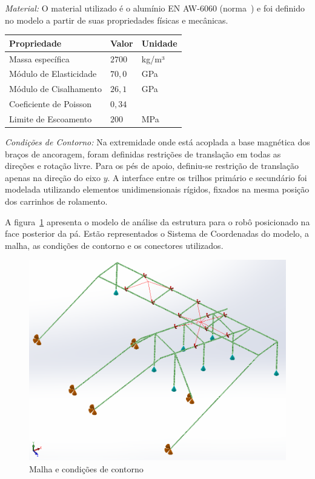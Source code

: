 \textit{Material:} O material utilizado é o alumínio EN AW-6060
(norma~\cite{DIN_2007}) e foi definido no modelo a partir de suas propriedades físicas e mecânicas.

\begin{center}
\centering
\begin{tabular}{|l|l|l|}
\hline
\textbf{Propriedade}   & \textbf{Valor}   & \textbf{Unidade}  \\ \hline
Massa específica       & $2700$           & kg/m³             \\ \hline
Módulo de Elasticidade & $70,0$           & GPa               \\ \hline
Módulo de Cisalhamento & $26,1$           & GPa               \\ \hline
Coeficiente de Poisson & $0,34$           &                   \\ \hline
Limite de Escoamento   & $200$            & MPa               \\ \hline
\end{tabular}
\label{tab::prop_material}
\end{center}


\textit{Condições de Contorno:} Na extremidade onde está acoplada a base
magnética dos braços de ancoragem, foram definidas restrições de translação
em todas as direções e rotação livre. Para os pés de apoio, definiu-se restrição
de translação apenas na direção do eixo $y$. A interface entre os trilhos
primário e secundário foi modelada utilizando elementos unidimensionais rígidos, fixados na
mesma posição dos carrinhos de rolamento.

A figura~\ref{fig::contorno} apresenta o modelo de análise da estrutura para o
robô posicionado na face posterior da pá. Estão representados o Sistema de
Coordenadas do modelo, a malha, as condições de contorno e os conectores
utilizados.

\begin{figure}[h!]
	\centering
	\includegraphics[width=0.9\columnwidth]{method/figs/dimensionamento/contorno}
	\caption{Malha e condições de contorno}
    \label{fig::contorno}
\end{figure}

